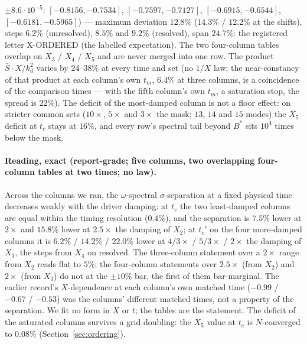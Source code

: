\documentclass[11pt,a4paper]{article}
\newcommand{\kd}{k_d}
\newcommand{\tm}{t_m}
\newcommand{\Bst}{B^*}
\newcommand{\Sbar}{\bar S}
\begin{document}
$\pm8.6\cdot10^{-5}$: $[-0.8156,-0.7534]$, $[-0.7597,-0.7127]$, $[-0.6915,-0.6544]$, $[-0.6181,-0.5965]$) --- maximum deviation $12.8\%$ ($14.3\%$ / $12.2\%$ at the shifts), steps $6.2\%$ (unresolved), $8.5\%$ and $9.2\%$ (resolved), span $24.7\%$: the registered letter X-ORDERED (the labelled expectation). The two four-column tables overlap on $X_3$ / $X_4$ / $X_5$ and are never merged into one row. The product $\Sbar\cdot X/\kd^2$ varies by $24$--$38\%$ at every time and set (no $1/X$ law; the near-constancy of that product at each column's own $\tm$, $6.4\%$ at three columns, is a coincidence of the comparison times --- with the fifth column's own $\tm$, a saturation stop, the spread is $22\%$). The deficit of the most-damped column is not a floor effect: on stricter common sets ($10\times$, $5\times$ and $3\times$ the mask; $13$, $14$ and $15$ modes) the $X_5$ deficit at $t_c$ stays at $16\%$, and every row's spectral tail beyond $\Bst$ sits $10^4$ times below the mask.

\paragraph{Reading, exact (report-grade; five columns, two overlapping four-column tables at two times; no law).} Across the columns we ran, the $\omega$-spectral $\sigma$-separation at a fixed physical time decreases weakly with the driver damping: at $t_c$ the two least-damped columns are equal within the timing resolution ($0.4\%$), and the separation is $7.5\%$ lower at $2\times$ and $15.8\%$ lower at $2.5\times$ the damping of $X_2$; at $t_c'$ on the four more-damped columns it is $6.2\%$ / $14.2\%$ / $22.0\%$ lower at $4/3\times$ / $5/3\times$ / $2\times$ the damping of $X_3$, the steps from $X_4$ on resolved. The three-column statement over a $2\times$ range from $X_2$ reads flat to $5\%$; the four-column statements over $2.5\times$ (from $X_2$) and $2\times$ (from $X_3$) do not at the $\pm10\%$ bar, the first of them bar-marginal. The earlier record's $X$-dependence at each column's own matched time ($-0.99$ / $-0.67$ / $-0.53$) was the columns' different matched times, not a property of the separation. We fit no form in $X$ or $t$; the tables are the statement. The deficit of the saturated columns survives a grid doubling: the $X_5$ value at $t_c$ is $N$-converged to $0.08\%$ (Section~\ref{sec:ordering}).
\end{document}
